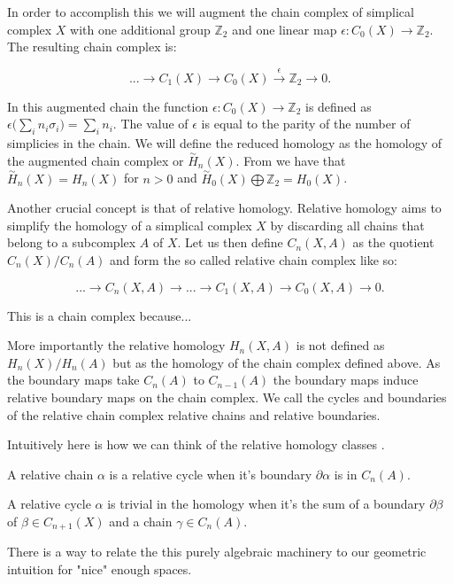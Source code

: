 In order to accomplish this we will augment the chain complex of simplical complex $X$ with one additional group $\mathbb{Z}_2$ and one linear map $\epsilon : C_0(X) \to \mathbb{Z}_2$. The resulting chain complex is:

$$ ... \longrightarrow C_1(X) \longrightarrow C_0(X) \overset{\epsilon}{\longrightarrow} \mathbb{Z}_2 \longrightarrow 0 .$$

In this augmented chain the function $\epsilon: C_0(X) \to \mathbb{Z}_2$ is defined as $\epsilon\big(\sum_{i}n_i\sigma_i\big) = \sum_{i}n_i$. The value of $\epsilon$ is equal to the parity of the number of simplicies in the chain. We will define the reduced homology as the homology of the augmented chain complex or $\overset{\sim}{H}_n(X)$. From \cite{algebraic-topology} we have that $\overset{\sim}{H}_n(X) = H_n(X)$ for $n > 0$ and $\overset{\sim}{H}_0(X) \bigoplus \mathbb{Z}_2 = H_0(X)$.

Another crucial concept is that of relative homology. Relative homology aims to simplify the homology of a simplical complex $X$ by discarding all chains that belong to a subcomplex $A$ of $X$. Let us then define $C_n(X, A)$ as the quotient $C_n(X) / C_n(A)$ and form the so called relative chain complex like so:

$$ ... \longrightarrow C_n(X, A) \longrightarrow ... \longrightarrow C_1(X, A) \longrightarrow C_0(X, A) \longrightarrow 0. $$

This is a chain complex because...

More importantly the relative homology $H_n(X, A)$ is not defined as $H_n(X) / H_n(A)$ but as the homology of the chain complex defined above. As the boundary maps take $C_n(A)$ to $C_{n-1}(A)$ the boundary maps induce relative boundary maps on the chain complex. We call the cycles and boundaries of the relative chain complex relative chains and relative boundaries.

Intuitively here is how we can think of the relative homology classes \cite{algebraic-topology}.

A relative chain $\alpha$ is a relative cycle when it's boundary $\partial\alpha $ is in $C_n(A)$.

A relative cycle $\alpha$ is trivial in the homology when it's the sum of a boundary $\partial \beta$ of $\beta \in C_{n+1}(X)$ and a chain $\gamma \in C_n(A)$.

There is a way to relate the this purely algebraic machinery to our geometric intuition for "nice" enough spaces.


